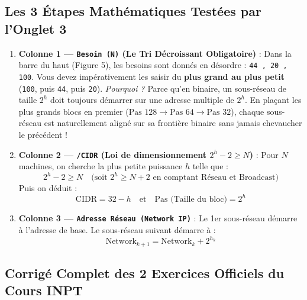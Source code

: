 \documentclass[11pt,a4paper]{article}
\begin{document}
\subsection{Les 3 Étapes Mathématiques Testées par l'Onglet 3}
\begin{enumerate}
    \item \textbf{Colonne 1 — \texttt{Besoin (N)} (Le Tri Décroissant Obligatoire)} :
    Dans la barre du haut (Figure 5), les besoins sont donnés en désordre : \texttt{44 , 20 , 100}.
    Vous devez impérativement les saisir du \textbf{plus grand au plus petit} (\texttt{100}, puis \texttt{44}, puis \texttt{20}).
    \textit{Pourquoi ?} Parce qu'en binaire, un sous-réseau de taille $2^h$ doit toujours démarrer sur une adresse multiple de $2^h$. En plaçant les plus grands blocs en premier ($\text{Pas } 128 \to \text{Pas } 64 \to \text{Pas } 32$), chaque sous-réseau est naturellement aligné sur sa frontière binaire sans jamais chevaucher le précédent !
    \item \textbf{Colonne 2 — \texttt{/CIDR} (Loi de dimensionnement $2^h - 2 \ge N$)} :
    Pour $N$ machines, on cherche la plus petite puissance $h$ telle que :
    $$2^h - 2 \ge N \quad \text{(soit } 2^h \ge N + 2\text{ en comptant Réseau et Broadcast)}$$
    Puis on déduit :
    $$\text{CIDR} = 32 - h \quad \text{et} \quad \text{Pas (Taille du bloc)} = 2^h$$
    \item \textbf{Colonne 3 — \texttt{Adresse Réseau (Network IP)}} :
    Le 1er sous-réseau démarre à l'adresse de base. Le sous-réseau suivant démarre à :
    $$\text{Network}_{k+1} = \text{Network}_k + 2^{h_k}$$
\end{enumerate}

\subsection{Corrigé Complet des 2 Exercices Officiels du Cours INPT}
\end{document}
